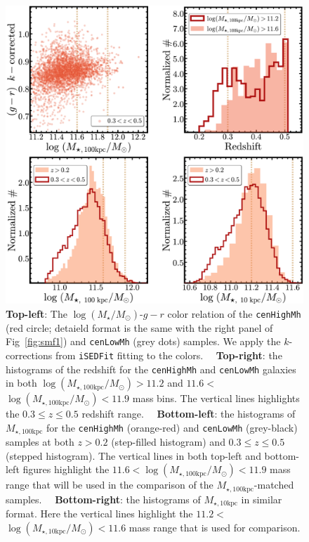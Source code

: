 \documentclass[a4paper,fleqn,usenatbib]{mnras}
\def\rbcg{\texttt{cenHighMh}}
\def\nbcg{\texttt{cenLowMh}}
\def\logms{{$\log (M_{\star}/M_{\odot})$}}
\def\minn{{$M_{\star,10\mathrm{kpc}}$}}
\def\mtot{{$M_{\star,100\mathrm{kpc}}$}}
\def\logminn{{$\log (M_{\star,10\mathrm{kpc}}/M_{\odot})$}}
\def\logmtot{{$\log (M_{\star,100\mathrm{kpc}}/M_{\odot})$}}
\begin{document}
  \begin{figure}
      \centering 
      \includegraphics[width=\columnwidth]{fig/redbcg_sample_stats}
      \caption{
          \textbf{Top-left}: The \logms{}-$g-r$ color relation of the \rbcg{} 
          (red circle; detaield format is the same with the right panel of 
          Fig~\ref{fig:smf1}) and \nbcg{} (grey dots) samples.
          We apply the $k$-corrections from \texttt{iSEDFit} fitting to the colors.~~          
          \textbf{Top-right}: the histograms of the redshift for the \rbcg{} and 
          \nbcg{} galaxies in both \logmtot$>11.2$ and $11.6<$\logmtot{}$<11.9$
          mass bins.
          The vertical lines highlights the $0.3\leq z \leq 0.5$ redshift range.~~
          \textbf{Bottom-left}: the histograms of \mtot{} for the \rbcg{} (orange-red) 
          and \nbcg{} (grey-black) samples at both $z>0.2$ (step-filled histogram) and 
          $0.3 \leq z \leq 0.5$ (stepped histogram). 
          The vertical lines in both top-left and bottom-left figures highlight the 
          $11.6<$\logmtot{}$<11.9$ mass range that will be used in the comparison of 
          the \mtot{}-matched samples.~~
          \textbf{Bottom-right}: the histograms of \minn{} in similar format. 
          Here the vertical lines highlight the 
          $11.2<$\logminn{}$<11.6$ mass range that is used for comparison.
      }
      \label{fig:sample_stats}
  \end{figure}
\end{document}
